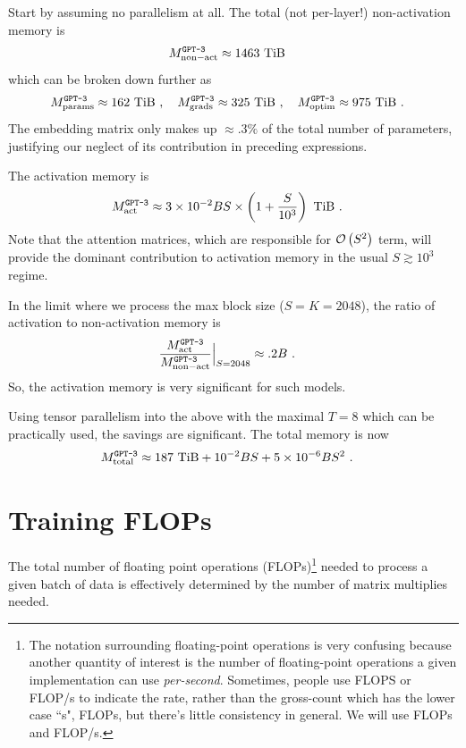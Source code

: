 \documentclass[11pt]{article}
\begin{document}
Start by assuming no parallelism at all. The total (not per-layer!) non-activation memory is
\begin{align}
  M _{ {\rm non-act}  } ^ \texttt{GPT-3} & \approx 1463\ {\rm TiB}
\end{align}
which can be broken down further as
\begin{align}
  M _{ {\rm params}  } ^ \texttt{GPT-3} & \approx 162\ {\rm TiB} \ , \quad
 M _{ {\rm grads}  } ^ \texttt{GPT-3}  \approx 325\ {\rm TiB}\ , \quad
  M _{ {\rm optim}  } ^ \texttt{GPT-3}  \approx 975\ {\rm TiB}\ .
\end{align}
The embedding matrix only makes up $ \approx .3\% $ of the total number of parameters, justifying our
neglect of its contribution in preceding expressions.


The activation memory is
\begin{align}
  M _{ {\rm act}  } ^ \texttt{GPT-3} & \approx 3 \times 10 ^{ -2 }BS\times  \left (  1  + \frac{ S
  }{ 10 ^{ 3 } } \right ) \ {\rm TiB} \ .
\end{align}
Note that the attention matrices, which are responsible for $ \mathcal{O} \left( S ^{ 2 } \right)  $ term, will
provide the dominant contribution to activation memory in the usual $ S \gtrsim 10 ^{ 3 } $ regime.

In the limit where we process the max block size ($ S=K=2048 $), the ratio of activation to
non-activation memory is
\begin{align}
  \frac{  M _{ {\rm act}  } ^ \texttt{GPT-3}}{ M _{ {\rm non-act}  } ^ \texttt{GPT-3} }\Big| _{
  S=2048 } & \approx  .2 B \ .
\end{align}
So, the activation memory is very significant for such models.


Using tensor parallelism into the above with the maximal $ T=8 $ which can be practically used, the
savings are significant. The total memory is now
\begin{align}
  M _{ {\rm total}  } ^{ \texttt{GPT-3}  } & \approx 187\ {\rm TiB} + 10 ^{ -2 }BS + 5 \times 10 ^{
  -6} BS ^{ 2 }\ .
\end{align}




\section{Training FLOPs \label{sec_flops} }

The total number of floating point operations (FLOPs)\footnote{The notation surrounding
floating-point operations is very confusing because another quantity of interest is the number
of floating-point operations a given implementation can use \textit{per-second}. Sometimes,
people use FLOPS or FLOP/s to indicate the rate, rather than the gross-count which has the lower
case ``s", FLOPs, but there's little consistency in general. We will use FLOPs and FLOP/s.}  needed to process a given batch of
data is effectively determined by the number of matrix multiplies needed.
\end{document}
